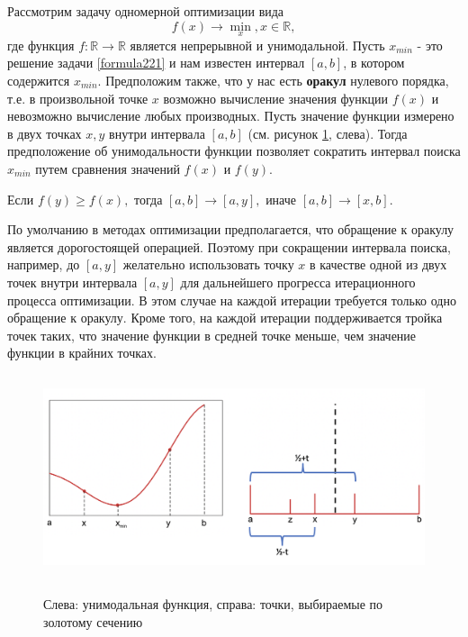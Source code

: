 Рассмотрим задачу одномерной оптимизации вида
\begin{equation}
    \label{formula221}
    f(x)\to \min_{x}, x \in \mathbb{R},
\end{equation}
где функция $f : \mathbb{R} \to \mathbb{R}$ является непрерывной и унимодальной. Пусть $x_{min}$ - это решение задачи \ref{formula221} и
нам известен интервал $[a, b]$, в котором содержится $x_{min}$. Предположим также, что у нас есть \textbf{оракул} нулевого порядка, т.е. в произвольной точке $x$ возможно вычисление значения функции $f(x)$ и невозможно вычисление любых производных.
\newline Пусть значение функции измерено в двух точках $x, y$ внутри интервала $[a, b]$ (см. рисунок \ref{ris:im221}, слева). Тогда предположение об унимодальности функции позволяет сократить интервал поиска $x_{min}$ путем сравнения значений $f(x)$ и $f(y).$
\begin{center}
    Если $f(y) \geq f(x),$ тогда $[a, b] \to [a, y],$
    иначе $ [a, b] \to [x, b]$.
\end{center}
По умолчанию в методах оптимизации предполагается, что обращение к оракулу является дорогостоящей операцией. Поэтому при сокращении интервала поиска, например, до $[a,y]$ желательно использовать точку $x$ в качестве одной из двух точек внутри интервала $[a,y]$ для дальнейшего прогресса итерационного процесса оптимизации. В этом случае на каждой итерации требуется только одно обращение к оракулу. Кроме того, на каждой итерации поддерживается тройка точек таких, что значение функции в средней точке меньше, чем значение функции в крайних точках.
\begin{figure}[hbt!]
    \centering
    \includegraphics[width=16cm, height=6cm]{images/im221.png}
    \label{ris:im221}
    \caption{Слева: унимодальная функция, справа: точки, выбираемые по золотому сечению}
\end{figure}


